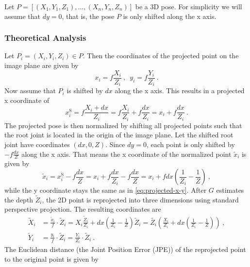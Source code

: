 Let $P = [(X_1, Y_1, Z_1), \dotsc, (X_n, Y_n, Z_n)]$ be a 3D pose.
For simplicity we will assume that $dy = 0$, that is, the pose $P$ is only shifted along the x axis.

\subsubsection{Theoretical Analysis}
\label{sec:x-shift-error-theoretical}
Let $P_i = (X_i, Y_i, Z_i) \in P$.
Then the coordinates of the projected point on the image plane are given by
\begin{equation}
	x_i = f \frac{X_i}{Z_i} \ ,\enspace y_i = f \frac{Y_i}{Z_i} \ .
\end{equation}
Now assume that $P_i$ is shifted by $dx$ along the x axis.
This results in a projected x coordinate of
\begin{equation}
	\label{eq:projected-x-y}
	x_i^\mathrm{S} = f \frac{X_i + dx}{Z_i} = f \frac{X_i}{Z_i} + f \frac{dx}{Z_i} = x_i + f \frac{dx}{Z_i}\ .
\end{equation}
The projected pose is then normalized by shifting all projected points such that the root joint is located in the origin of the image plane. 
Let the shifted root joint have coordinates $(dx, 0, Z)$.
Since $dy = 0$, each point is only shifted by $- f \frac{dx}{Z}$ along the x axis.
That means the x coordinate of the normalized point $\widetilde{x}_i$ is given by
\begin{equation}
	\widetilde{x}_i
	= x_i^\mathrm{S} - f \frac{dx}{Z}
	= x_i + f \frac{dx}{Z_i} - f \frac{dx}{Z}
	= x_i + f dx (\frac{1}{Z_i} - \frac{1}{Z}) \ , 
\end{equation}
while the y coordinate stays the same as in \eqref{eq:projected-x-y}.
After $G$ estimates the depth $\widetilde{Z}_i$, the 2D point is reprojected into three dimensions using standard perspective projection. The resulting coordinates are 
\begin{align}
	\label{eq:re-projected-X}
	\widetilde{X}_i &= \frac{\widetilde{x}_i}{f} \cdot \widetilde{Z}_i
	= X_i \frac{\widetilde{Z}_i}{Z_i} + dx (\frac{1}{Z_i} - \frac{1}{Z}) \widetilde{Z}_i
	= \widetilde{Z_i} \left( \frac{X_i}{Z_i} + dx \left( \frac{1}{Z_i} - \frac{1}{Z} \right) \right) \ , \\
	\label{eq:re-projected-Y}
	\widetilde{Y}_i &= \frac{y_i}{f} \cdot \widetilde{Z}_i = \frac{Y_i}{Z_i} \cdot \widetilde{Z}_i \ .
\end{align}
The Euclidean distance (the Joint Position Error (JPE)) of the reprojected point to the original point is given by
